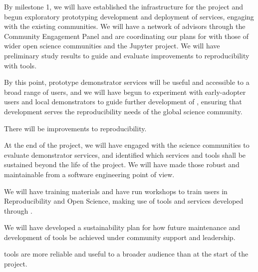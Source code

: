 \begin{milestones}
  {
  
  By milestone 1, we will have established the infrastructure for the project
  and begun exploratory prototyping development and deployment of services,
  engaging with the existing communities. We will have a network of advisors
  through the Community Engagement Panel and are coordinating our plans for
  \TheProject with those of wider open science communities and the Jupyter
  project. We will have preliminary study results to guide and evaluate
  improvements to reproducibility with \TheProject tools. }

  {
  
  By this point, prototype demonstrator services will be useful and accessible
  to a broad range of users, and we will have begun to experiment with early-adopter
  users and local demonstrators to guide further development of \TheProject,
  ensuring that development serves the reproducibility needs of the global science community.
  
  There will be improvements to reproducibility.
  }

  {
  At the end of the project, 
  we will have engaged with the science communities to evaluate demonstrator services, and 
  identified which services and tools shall be sustained beyond the life of the project.
  We will have made those robust and maintainable from a software engineering point of view. 

  We will have training materials and have run workshops to train users in Reproducibility and Open Science,
  making use of tools and services developed through \TheProject.

  We will have developed a sustainability plan for how future maintenance and
  development of \TheProject tools be achieved under community support and
  leadership.

  \TheProject tools are more reliable and useful to a broader audience than at
  the start of the project.

  }


\end{milestones}
